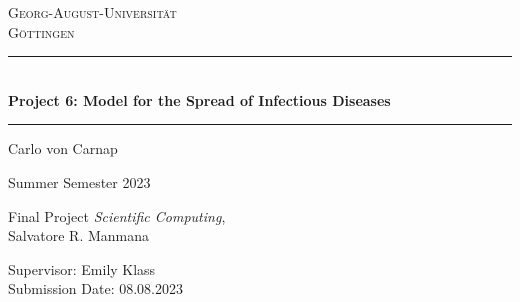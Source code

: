 \begin{titlepage}
    \centering
    \vspace*{0.5cm}
    \LARGE{\textsc{Georg-August-Universität} \\
    \textsc{Göttingen}}
    \vspace*{1.7cm}
    
    \rule{\textwidth}{1pt}\\[0.5cm]
    {\huge \bfseries
      Project 6: Model for the Spread of Infectious Diseases}\\
    \rule{\textwidth}{1pt}
    
    \vspace*{2.7cm}
    
    {\large Carlo von Carnap\\
    
    \vspace*{0.7cm}

    Summer Semester 2023}
    
    \vspace*{5.7cm}

    {\large Final Project \textit{Scientific Computing}, \\
    Salvatore R. Manmana

    \vspace*{0.7cm}
    
    Supervisor: Emily Klass \\
    Submission Date: 08.08.2023}

    \end{titlepage}